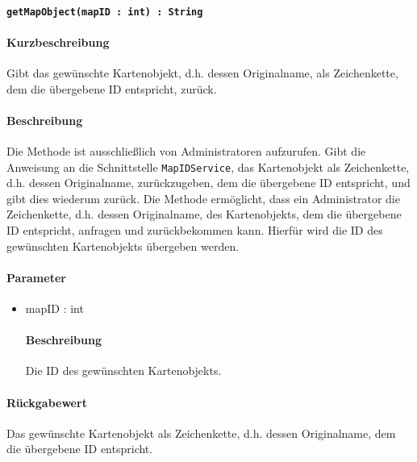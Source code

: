 \paragraph{\texttt{getMapObject(mapID : int) : String}}%
\paragraph*{Kurzbeschreibung}
Gibt das gewünschte Kartenobjekt, d.h. dessen Originalname, als Zeichenkette, dem die übergebene ID entspricht, zurück.
\paragraph*{Beschreibung}
Die Methode ist ausschließlich von Administratoren aufzurufen.
Gibt die Anweisung an die Schnittstelle \texttt{MapIDService}, das Kartenobjekt als Zeichenkette, d.h. dessen Originalname, zurückzugeben, dem die übergebene ID entspricht, und gibt dies wiederum zurück.
Die Methode ermöglicht, dass ein Administrator die Zeichenkette, d.h. dessen Originalname, des Kartenobjekts, dem die übergebene ID entspricht, anfragen und zurückbekommen kann.
Hierfür wird die ID des gewünschten Kartenobjekts übergeben werden.
\paragraph*{Parameter}
\begin{itemize}
	\item mapID : int
		\paragraph*{Beschreibung}
		Die ID des gewünschten Kartenobjekts.
\end{itemize}
\paragraph*{Rückgabewert}
Das gewünschte Kartenobjekt als Zeichenkette, d.h. dessen Originalname, dem die übergebene ID entspricht.
